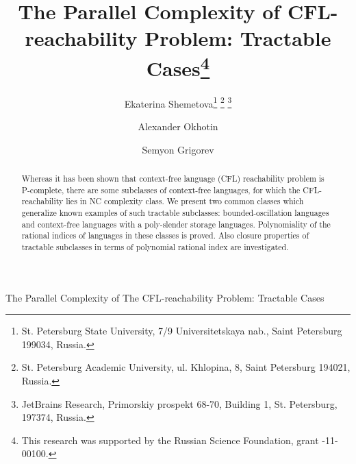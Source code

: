 \documentclass{ws-ijfcs}
\begin{document}
{The Parallel Complexity of The CFL-reachability Problem:
Tractable Cases
}

%
\catchline{}{}{}{}{}
%

\title{The Parallel Complexity of CFL-reachability Problem:
Tractable Cases\footnote{
This research was supported by the Russian Science Foundation, grant -11-00100.}}

\author{Ekaterina Shemetova\footnote{
St. Petersburg State University, 
7/9 Universitetskaya nab., Saint Petersburg 199034, Russia.}
\footnote{
St. Petersburg Academic University, 
ul. Khlopina, 8, Saint Petersburg 194021, Russia.}
\footnote{
JetBrains Research,
Primorskiy prospekt 68-70, Building 1, St. Petersburg, 197374, Russia.}
}

\address{
}

\author{Alexander Okhotin\footnotemark[2] }

\address{
}

\author{Semyon Grigorev\footnotemark[2] \footnotemark[4] }

\address{
}


\maketitle

\begin{history}
\end{history}

\begin{abstract}
Whereas it has been shown that  context-free language (CFL) reachability problem is P-complete, there are some subclasses of context-free languages, for which the CFL-reachability lies in NC complexity class. We present two common classes which generalize known examples of such tractable subclasses: bounded-oscillation languages and context-free languages with a poly-slender storage languages. Polynomiality of the rational indices of languages in these classes is proved. Also closure properties of tractable subclasses in terms of polynomial rational index are investigated.
\end{abstract}
\end{document}
